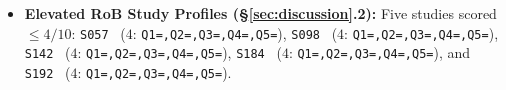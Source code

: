 \documentclass[10pt,twocolumn,a4paper]{article}
\begin{document}
\begin{itemize}[leftmargin=*,nosep]
    \item \textbf{Elevated RoB Study Profiles (\S\ref{sec:discussion}.2):} Five studies scored $\le 4/10$: \texttt{S057}~\cite{shetty2025syzygy} ($4$: \texttt{Q1=,\allowbreak  Q2=,\allowbreak  Q3=,\allowbreak  Q4=,\allowbreak  Q5=}), \texttt{S098}~\cite{wen2025hammer} ($4$: \texttt{Q1=,\allowbreak  Q2=,\allowbreak  Q3=,\allowbreak  Q4=,\allowbreak  Q5=}), \texttt{S142}~\cite{he2026attriguard} ($4$: \texttt{Q1=,\allowbreak  Q2=,\allowbreak  Q3=,\allowbreak  Q4=,\allowbreak  Q5=}), \texttt{S184}~\cite{arora2026specifying} ($4$: \texttt{Q1=,\allowbreak  Q2=,\allowbreak  Q3=,\allowbreak  Q4=,\allowbreak  Q5=}), and \texttt{S192}~\cite{kanvar2026meets} ($4$: \texttt{Q1=,\allowbreak  Q2=,\allowbreak  Q3=,\allowbreak  Q4=,\allowbreak  Q5=}).
\end{itemize}

\FloatBarrier


\end{document}

